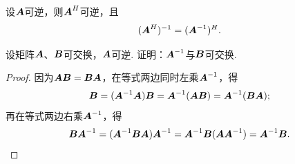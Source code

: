 \begin{property}\label{theorem:逆矩阵.共轭转置矩阵的逆与逆矩阵的共轭转置}
设\(\boldsymbol{A}\)可逆，则\(\boldsymbol{A}^H\)可逆，且\begin{equation}
	(\boldsymbol{A}^H)^{-1} = (\boldsymbol{A}^{-1})^H.
\end{equation}
\end{property}

\begin{example}
设矩阵\(\boldsymbol{A}\)、\(\boldsymbol{B}\)可交换，\(\boldsymbol{A}\)可逆.
证明：\(\boldsymbol{A}^{-1}\)与\(\boldsymbol{B}\)可交换.
\begin{proof}
因为\(\boldsymbol{A}\boldsymbol{B} = \boldsymbol{B}\boldsymbol{A}\)，在等式两边同时左乘\(\boldsymbol{A}^{-1}\)，得\begin{equation*}
	\boldsymbol{B} = (\boldsymbol{A}^{-1}\boldsymbol{A})\boldsymbol{B} = \boldsymbol{A}^{-1}(\boldsymbol{A}\boldsymbol{B}) = \boldsymbol{A}^{-1}(\boldsymbol{B}\boldsymbol{A});
\end{equation*}
再在等式两边右乘\(\boldsymbol{A}^{-1}\)，得\begin{equation*}
	\boldsymbol{B}\boldsymbol{A}^{-1} = (\boldsymbol{A}^{-1}\boldsymbol{B}\boldsymbol{A})\boldsymbol{A}^{-1} = \boldsymbol{A}^{-1}\boldsymbol{B}(\boldsymbol{A}\boldsymbol{A}^{-1}) = \boldsymbol{A}^{-1}\boldsymbol{B}.
	\qedhere
\end{equation*}
\end{proof}
\end{example}

